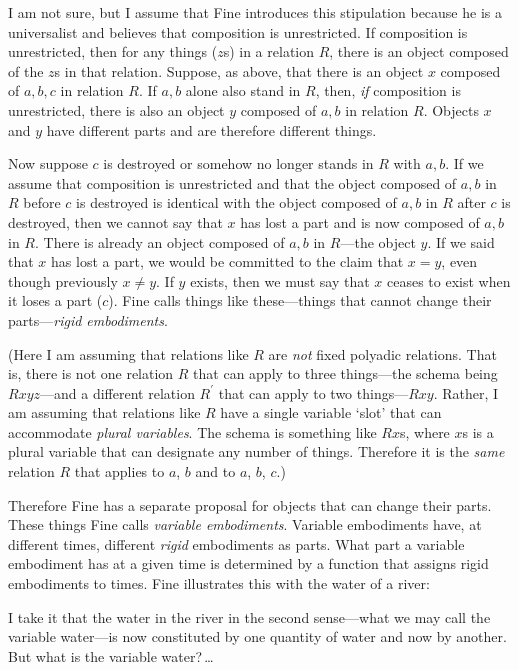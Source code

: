 \documentclass[11pt]{article}
\newenvironment{squote}{%
\begin{spacing}{1}
\begin{list}{}{%
\setlength{\labelwidth}{0pt}%
\rightmargin\leftmargin%
}
\item\relax
}{%
\end{list}%
\end{spacing}
}
\begin{document}
\begin{spacing}{1.5}
I am not sure, but I assume that Fine introduces this stipulation
because he is a universalist and believes that composition is
unrestricted.  If composition is unrestricted, then for any things
($z$s) in a relation $R$, there is an object composed of the $z$s in
that relation.  Suppose, as above, that there is an object $x$
composed of $a, b, c$ in relation $R$.  If $a, b$ alone also stand in
$R$, then, {\em if} composition is unrestricted, there is also an
object $y$ composed of $a, b$ in relation $R$.  Objects $x$ and $y$
have different parts and are therefore different things.

Now suppose $c$ is destroyed or somehow no longer stands in $R$ with
$a, b$.  If we assume that composition is unrestricted and that the
object composed of $a, b$ in $R$ before $c$ is destroyed is identical
with the object composed of $a, b$ in $R$ after $c$ is destroyed, then
we cannot say that $x$ has lost a part and is now composed of $a, b$
in $R$.  There is already an object composed of $a, b$ in $R$---the
object $y$.  If we said that $x$ has lost a part, we would be
committed to the claim that $x = y$, even though previously $x \neq
y$.  If $y$ exists, then we must say that $x$ ceases to exist when it
loses a part ($c$).  Fine calls things like these---things that cannot
change their parts---{\em rigid embodiments}.

(Here I am assuming that relations like $R$ are {\em not} fixed
polyadic relations.  That is, there is not one relation $R$ that can
apply to three things---the schema being $Rxyz$---and a different
relation $R^{\prime}$ that can apply to two things---$Rxy$.  Rather, I
am assuming that relations like $R$ have a single variable `slot' that
can accommodate {\em plural variables}.  The schema is something like
$Rx$s, where $x$s is a plural variable that can designate any number
of things.  Therefore it is the {\em same} relation $R$ that applies
to $a$, $b$ and to $a$, $b$, $c$.)

Therefore Fine has a separate proposal for objects that can change
their parts.  These things Fine calls {\em variable embodiments}.
Variable embodiments have, at different times, different {\em rigid}
embodiments as parts.  What part a variable embodiment has at a given
time is determined by a function that assigns rigid embodiments to
times.  Fine illustrates this with the water of a river:

\begin{squote}
I take it that the water in the river in the second sense---what we may
call the variable water---is now constituted by one quantity of water
and now by another. But what is the variable water?\,\ldots


\end{squote}
\end{spacing}
\end{document}
